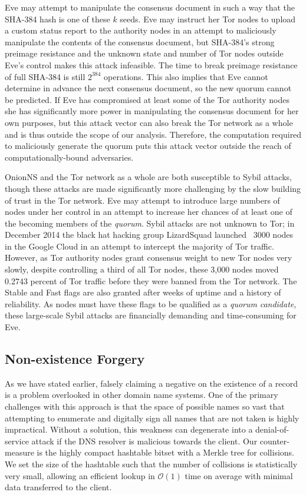 Eve may attempt to manipulate the consensus document in such a way that the SHA-384 hash is one of these $ k $ seeds. Eve may instruct her Tor nodes to upload a custom status report to the authority nodes in an attempt to maliciously manipulate the contents of the consensus document, but SHA-384's strong preimage resistance and the unknown state and number of Tor nodes outside Eve's control makes this attack infeasible. The time to break preimage resistance of full SHA-384 is still $ 2^{384} $ operations. This also implies that Eve cannot determine in advance the next consensus document, so the new quorum cannot be predicted. If Eve has compromised at least some of the Tor authority nodes she has significantly more power in manipulating the consensus document for her own purposes, but this attack vector can also break the Tor network as a whole and is thus outside the scope of our analysis. Therefore, the computation required to maliciously generate the quorum puts this attack vector outside the reach of computationally-bound adversaries.

OnionNS and the Tor network as a whole are both susceptible to Sybil attacks, though these attacks are made significantly more challenging by the slow building of trust in the Tor network. Eve may attempt to introduce large numbers of nodes under her control in an attempt to increase her chances of at least one of the becoming members of the \emph{quorum}. Sybil attacks are not unknown to Tor; in December 2014 the black hat hacking group LizardSquad launched ~3000 nodes in the Google Cloud in an attempt to intercept the majority of Tor traffic. However, as Tor authority nodes grant consensus weight to new Tor nodes very slowly, despite controlling a third of all Tor nodes, these 3,000 nodes moved 0.2743 percent of Tor traffic before they were banned from the Tor network. The Stable and Fast flags are also granted after weeks of uptime and a history of reliability. As nodes must have these flags to be qualified as a \emph{quorum} \emph{candidate}, these large-scale Sybil attacks are financially demanding and time-consuming for Eve.

\subsection{Non-existence Forgery}

As we have stated earlier, falsely claiming a negative on the existence of a record is a problem overlooked in other domain name systems. One of the primary challenges with this approach is that the space of possible names so vast that attempting to enumerate and digitally sign all names that are not taken is highly impractical. Without a solution, this weakness can degenerate into a denial-of-service attack if the DNS resolver is malicious towards the client. Our counter-measure is the highly compact hashtable bitset with a Merkle tree for collisions. We set the size of the hashtable such that the number of collisions is statistically very small, allowing an efficient lookup in $ \mathcal{O}(1) $ time on average with minimal data transferred to the client.

